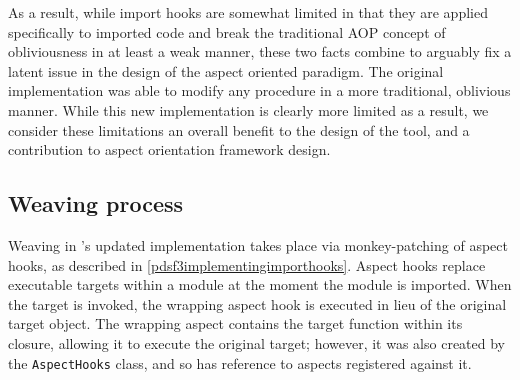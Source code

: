     
As a result, while import hooks are somewhat limited in that they are applied
specifically to imported code and break the traditional AOP concept of
obliviousness in at least a weak manner, these two facts combine to arguably fix
a latent issue in the design of the aspect oriented paradigm. The original
\pdsf{} implementation was able to modify any procedure in a more traditional,
oblivious manner. While this new implementation is clearly more limited as a
result, we consider these limitations an overall benefit to the design of the
tool, and a contribution to aspect orientation framework design.


\subsection{Weaving process}\label{subsec:pdsf3_weaving_process}


Weaving in \pdsf{}'s updated implementation takes place via monkey-patching of
aspect hooks, as described in \cref{pdsf3implementingimporthooks}. Aspect hooks
replace executable targets within a module at the moment the module is imported.
When the target is invoked, the wrapping aspect hook is executed in lieu of the
original target object. The wrapping aspect contains the target function within
its closure, allowing it to execute the original target; however, it was also
created by the \lstinline{AspectHooks} class, and so has reference to aspects
registered against it. 

